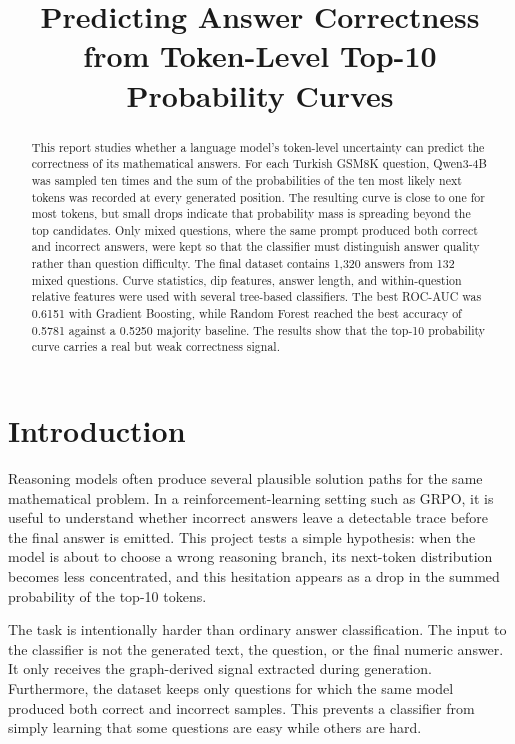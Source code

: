 \documentclass[conference]{IEEEtran}
\title{Predicting Answer Correctness from Token-Level Top-10 Probability Curves}
\author{
\IEEEauthorblockN{Özgür Aslan}
\IEEEauthorblockA{Yildiz Technical University\\
Computational Semantics Final Project Report}
}
\begin{document}
\maketitle

\begin{abstract}
This report studies whether a language model's token-level uncertainty can
predict the correctness of its mathematical answers. For each Turkish GSM8K
question, Qwen3-4B was sampled ten times and the sum of the probabilities of
the ten most likely next tokens was recorded at every generated position. The
resulting curve is close to one for most tokens, but small drops indicate that
probability mass is spreading beyond the top candidates. Only mixed questions,
where the same prompt produced both correct and incorrect answers, were kept so
that the classifier must distinguish answer quality rather than question
difficulty. The final dataset contains 1,320 answers from 132 mixed questions.
Curve statistics, dip features, answer length, and within-question relative
features were used with several tree-based classifiers. The best ROC-AUC was
0.6151 with Gradient Boosting, while Random Forest reached the best accuracy of
0.5781 against a 0.5250 majority baseline. The results show that the top-10
probability curve carries a real but weak correctness signal.
\end{abstract}

\section{Introduction}
Reasoning models often produce several plausible solution paths for the same
mathematical problem. In a reinforcement-learning setting such as GRPO, it is
useful to understand whether incorrect answers leave a detectable trace before
the final answer is emitted. This project tests a simple hypothesis: when the
model is about to choose a wrong reasoning branch, its next-token distribution
becomes less concentrated, and this hesitation appears as a drop in the summed
probability of the top-10 tokens.

The task is intentionally harder than ordinary answer classification. The input
to the classifier is not the generated text, the question, or the final numeric
answer. It only receives the graph-derived signal extracted during generation.
Furthermore, the dataset keeps only questions for which the same model produced
both correct and incorrect samples. This prevents a classifier from simply
learning that some questions are easy while others are hard.
\end{document}
